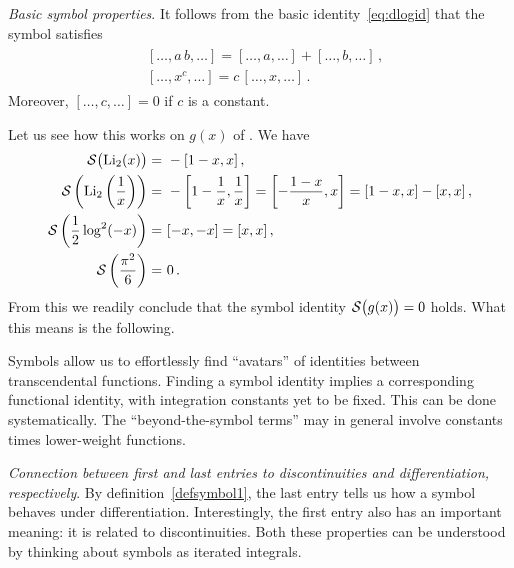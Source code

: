 \smallskip

{\it Basic symbol properties}. It follows from the basic identity~\eqref{eq:dlogid} that the symbol satisfies
\begin{align} \label{eq:symbol_properties} \begin{aligned}
& [\ldots , a \, b , \ldots ] = [\ldots, a , \ldots ] +  [\ldots, b , \ldots ]\,, \\
& [\ldots , x^c , \ldots ] =c \, [\ldots, x , \ldots ]\,.
\end{aligned} \end{align}
Moreover, $[\ldots , c , \ldots ] = 0$ if $c$ is a constant.

Let us see how this works on $g(x)$ of . We have
\begin{align}
{\cal S}\bigl({\rm Li}_{2}(x) \bigr) = \ & - [1-x,x] \,, \\
{\cal S}\left({\rm Li}_{2}\left(\frac{1}{x}\right)\right) = \ & - \left[1-\frac{1}{x},\frac{1}{x} \right] =  \left[- \frac{1-x}{x},x\right]  = [1-x,x]-[x,x]  \,, \\
{\cal S}\left(\frac{1}{2} \log^2(-x) \right) = \ &  [-x,-x] = [x,x]  \,, \\
{\cal S}\left(\frac{\pi^2}{6}\right) = \ & 0\,.
\end{align}
From this we readily conclude that the symbol identity ${\cal S}\bigl( g(x) \bigr) = 0$ holds.
What this means is the following.

\begin{important}{Symbols allow us to effortlessly find ``avatars'' of identities between transcendental functions.}
Finding a symbol identity implies a corresponding functional identity, with integration constants yet to be fixed. This can be done systematically. The ``beyond-the-symbol terms'' may in general involve constants times lower-weight functions.
\end{important}

\smallskip

{\it Connection between first and last entries to discontinuities and differentiation, respectively}.
%
By definition~\eqref{defsymbol1}, the last entry tells us how a symbol behaves under differentiation.
Interestingly, the first entry also has an important meaning: it is related to discontinuities.
Both these properties can be understood by thinking about symbols as iterated integrals.

